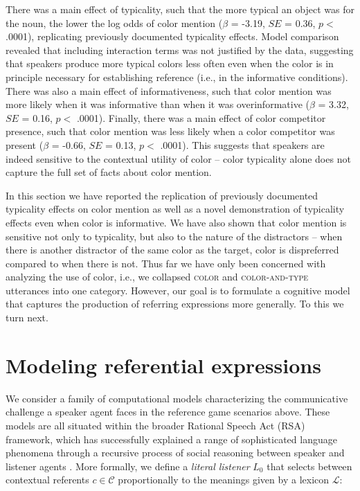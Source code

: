 \documentclass[10pt,letterpaper]{article}
\begin{document}
There was a main effect of typicality, such that the more typical an object was for the noun, the lower the log odds of color mention ($\beta$ = -3.19, $SE$ = 0.36, $p <$ .0001), replicating previously documented typicality effects. Model comparison revealed that including interaction terms was not justified by the data, suggesting that speakers produce more typical colors less often even when the color is in principle necessary for establishing reference (i.e., in the informative conditions). There was also a main effect of informativeness, such that color mention was more likely when it was informative than when it was overinformative   ($\beta$ = 3.32, $SE$ = 0.16, $p <$ .0001). Finally, there was a main effect of color competitor presence, such that color mention was less likely when a color competitor was present  ($\beta$ = -0.66, $SE$ = 0.13, $p <$ .0001). This suggests that speakers are indeed sensitive to the contextual utility of color -- color typicality alone does not capture the full set of facts about color mention.

In this section we have reported the replication of previously documented typicality effects on color mention as well as a novel demonstration of typicality effects even when color is informative. We have also shown that color mention is sensitive not only to typicality, but also to the  nature of the distractors -- when there is another distractor of the same color as the target, color is dispreferred compared to when there is not. 
Thus far we have only been concerned with analyzing the use of color, i.e., we collapsed \textsc{color} and \textsc{color-and-type} utterances into one category. However, our goal is to formulate a cognitive model that captures the production of referring expressions more generally. To this we turn next.

\section{Modeling referential expressions}

We consider a family of computational models characterizing the communicative challenge a speaker agent faces in the reference game scenarios above. These models are all situated within the broader Rational Speech Act (RSA) framework, which has successfully explained a range of sophisticated language phenomena through a recursive process of social reasoning between speaker and listener agents \cite{frank2012, goodmanstuhlmueller2013, GoodmanFrank2016}. More formally, we define a \emph{literal listener} $L_0$ that selects between contextual referents $c \in \mathcal{C}$ proportionally to the meanings given by a lexicon $\mathcal{L}$:
\end{document}
